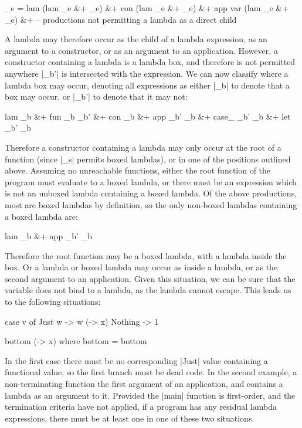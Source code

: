 \documentclass[preprint]{sigplanconf}
\begin{document}
\begin{code}
_e =  lam (lam _e &+ _e) &+ con (lam _e &+ _e) &+ app var (lam _e &+ _e) &+
      -- productions not permitting a lambda as a direct child
\end{code}

A lambda may therefore occur as the child of a lambda expression, as an argument to a constructor, or as an argument to an application. However, a constructor containing a lambda is a lambda box, and therefore is not permitted anywhere |_b'| is intersected with the expression. We can now classify where a lambda box may occur, denoting all expressions as either |_b| to denote that a box may occur, or |_b'| to denote that it may not:

\begin{code}
lam _b &+ fun _b _b' &+ con _b &+ app _b' _b &+ case_ _b' _b &+ let _b' _b
\end{code}

Therefore a constructor containing a lambda may only occur at the root of a function (since |_s| permits boxed lambdas), or in one of the positions outlined above. Assuming no unreachable functions, either the root function of the program must evaluate to a boxed lambda, or there must be an expression which is not an unboxed lambda containing a boxed lambda. Of the above productions, most are boxed lambdas by definition, so the only non-boxed lambdas containing a boxed lambda are:

\begin{code}
lam _b &+ app _b' _b
\end{code}

Therefore the root function may be a boxed lambda, with a lambda inside the box. Or a lambda or boxed lambda may occur as inside a lambda, or as the second argument to an application. Given this situation, we can be sure that the variable does not bind to a lambda, as the lambda cannot escape. This leads us to the following situations:

\begin{code}
case v of
    Just w -> w (\x -> x)
    Nothing -> 1

bottom (\x -> x)
    where bottom = bottom
\end{code}

In the first case there must be no corresponding |Just| value containing a functional value, so the first branch must be dead code. In the second example, a non-terminating function the first argument of an application, and contains a lambda as an argument to it. Provided the |main| function is first-order, and the termination criteria have not applied, if a program has any residual lambda expressions, there must be at least one in one of these two situations.
\end{document}
